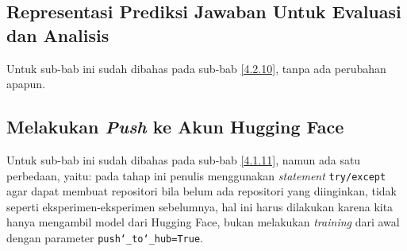 \subsection{Representasi Prediksi Jawaban Untuk Evaluasi dan Analisis}
\label{4.4.11}
Untuk sub-bab ini sudah dibahas pada sub-bab \ref{4.2.10}, tanpa ada perubahan apapun.

\subsection{Melakukan \emph{Push} ke Akun Hugging Face}
\label{4.4.12}
Untuk sub-bab ini sudah dibahas pada sub-bab \ref{4.1.11}, namun ada satu perbedaan, yaitu: pada tahap ini penulis menggunakan \emph{statement} \texttt{try/except} agar dapat membuat repositori bila belum ada repositori yang diinginkan, tidak seperti eksperimen-eksperimen sebelumnya, hal ini harus dilakukan karena kita hanya mengambil model dari Hugging Face, bukan melakukan \emph{training} dari awal dengan parameter \texttt{push\char`_to\char`_hub=True}.
